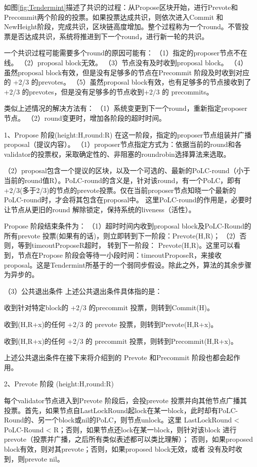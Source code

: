 \documentclass[a4paper,twoside]{scrbook}
\begin{document}
\begin{CJK}{UTF8}{gbsn}
如图\ref{fig:Tendermint}描述了共识的过程：从Propose区块开始，进行Prevote和Precommit两个阶段的投票。如果投票达成共识，则依次进入Commit 和 NewHeight阶段，完成共识，区块链高度增加。整个过程称为一个round。不管投票是否达成共识，系统将推进到下一个round，进行新一轮的共识。

一个共识过程可能需要多个round的原因可能有：
（1）指定的proposer节点不在线。
（2）proposal block无效。
（3）节点没有及时收到proposal block。
（4）虽然proposal block有效，但是没有足够多的节点在Precommit 阶段及时收到对应的 +2/3 的prevotes。
（5）虽然proposal block有效，也有足够多的节点接收到了+2/3 的prevotes，但是没有足够多的节点收到+2/3 的 precommits。

类似上述情况的解决方法有：
（1）系统变更到下一个round，重新指定proposer节点。
（2）round变更时，增加各阶段的超时时间。

1、Propose 阶段(height:H,round:R)
在这一阶段，指定的proposer节点组装并广播proposal（提议内容）。
（1）proposer节点指定方式为：依据当前的round和各validator的投票权，采取确定性的、非阻塞的roundrobin选择算法来选取。

（2）proposal包含一个提议的区块，以及一个可选的、最新的PoLC-round（小于当前的round值R）。PoLC-round的含义是，针对该round，有一个PoLC，即有+2/3(多于2/3)的节点的prevote投票。仅在当前proposer节点知晓一个最新的PoLC-round时，才会将其包含在proposal中。 这里PoLC-round的作用是，必要时让节点从更旧的round 解除锁定，保持系统的liveness（活性）。

Propose 阶段结束条件为：
（1）超时时间内收到proposal block及PoLC-Round的所有prevote 投票(如果有的话)，则立即转到下一阶段：Prevote(H,R)；
（2）否则，等到timeoutProposeR超时， 转到下一阶段： Prevote(H,R)。这里可以看到，节点在Propose 阶段会等待一小段时间：timeoutProposeR，来接收proposal。这是Tendermint所基于的一个弱同步假设。除此之外，算法的其余步骤为异步的。

（3）公共退出条件
上述公共退出条件具体指的是：

收到针对特定block的 +2/3 的precommit 投票，则转到Commit(H)。

收到(H,R+x)的任何 +2/3 的 prevote 投票，则转到Prevote(H,R+x)。

收到(H,R+x)的任何 +2/3 的 precommit 投票，则转到Precommit(H,R+x)。

上述公共退出条件在接下来将介绍到的 Prevote 和Precommit 阶段也都会起作用。

2、Prevote 阶段 (height:H,round:R)

每个validator节点进入到Prevote 阶段后，会投prevote 投票并向其他节点广播其投票。首先，如果节点自LastLockRound起lock在某一block，此时却有PoLC-Round的、另一个block或nil的PoLC，则节点unlock。这里 LastLockRound < PoLC-Round < R；否则，如果节点还lock在某一block，则针对该block 进行prevote（投票并广播，之后所有类似表述都可以类比理解）；
否则，如果proposed block有效，则对其prevote；否则，如果proposed block无效，或者 没有及时收到，则prevote nil。


\end{CJK}
\end{document}
